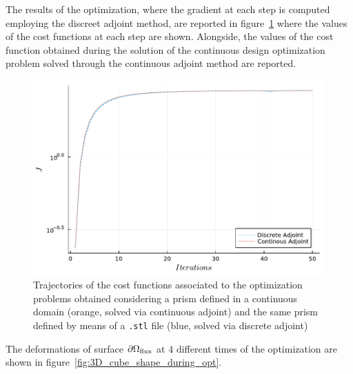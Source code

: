 The results of the optimization, where the gradient at each step is computed employing the discreet adjoint method, are reported in figure~\ref{fig:opt_history_3D} where the values of the cost functions at each step are shown. Alongside, the values of the cost function obtained during the solution of the continuous design optimization problem solved through the continuous adjoint method are reported.

\begin{figure}
	\centering
	\includegraphics[width=.75\textwidth]{img/cost_vs_iter_3D_discrete_vs_continuous_adjoint}
	\caption{Trajectories of the cost functions associated to the optimization problems obtained considering a prism defined in a continuous domain (orange, solved via continuous adjoint) and the same prism defined by means of a \texttt{.stl} file (blue, solved via discrete adjoint)}
	\label{fig:opt_history_3D}
\end{figure}

The deformations of surface $\partial\Omega_\textup{flux}$ at $4$ different times of the optimization are shown in figure~\ref{fig:3D_cube_shape_during_opt}.

